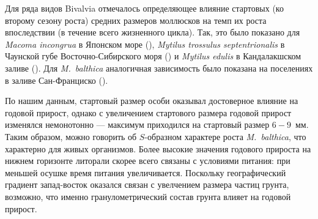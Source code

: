 Для ряда видов Bivalvia отмечалось определяющее влияние стартовых (ко второму сезону роста) средних размеров моллюсков на темп их роста впоследствии (в течение всего жизненного цикла). 
Так, это было показано для {\it Macoma incongrua}  в Японском море (\cite{Maximovich_Lysenko_1986}), {\it Mytilus trossulus septentrionalis} в Чаунской губе Восточно-Сибирского моря (\cite{Gagaev_et_al_1994}) и {\it Mytilus edulis} в Кандалакшском заливе (\cite{Maximovich_et_al_1993}). 
Для {\it M.~balthica} аналогичная зависимость было показана на поселениях в заливе Сан-Франциско (\cite{Cloern_Nichols_1978}). 

По нашим данным, стартовый размер особи оказывал достоверное влияние на годовой прирост, однако с увеличением стартового размера годовой прирост изменялся немонотонно — максимум приходился на стартовый размер $6-9$~мм. 
Таким образом, можно говорить об $S$-образном характере роста  {\it M.~balthica}, что характерно для живых организмов.
Более высокие значения годового прироста на нижнем горизонте литорали скорее всего связаны с условиями питания: при меньшей осушке время питания увеличивается.
Поскольку географический градиент запад-восток оказался связан с увелчением размера частиц грунта, возможно, что именно гранулометрический состав грунта влияет на годовой прирост. 





\afterpage{\clearpage}

\par\bigskip

